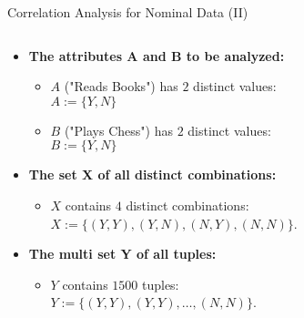 \begin{frame}{Correlation Analysis for Nominal Data (II)}
\begin{columns}
\begin{column}{0.5\textwidth}
\begin{itemize}
				      \begin{itemize}
					      \item \textbf{The attributes A and B to be analyzed:}
					            \begin{itemize}
						            \item $A$ ("Reads Books") has $2$ distinct
						                  values: \\
						                  $A := \{Y, N\}$
						            \item $B$ ("Plays Chess") has $2$ distinct values: \\
						                  $B := \{Y, N\}$
					            \end{itemize}
					      \item \textbf{The set X of all distinct combinations:}
					            \begin{itemize}
						            \item $X$ contains $4$ distinct combinations: \\
						                  $X := \{(Y, Y), (Y, N), (N, Y), (N, N)\}$.
					            \end{itemize}
					      \item \textbf{The multi set Y of all tuples:}
					            \begin{itemize}
						            \item $Y$ contains $1500$ tuples: \\
						                  $Y := \{(Y, Y), (Y, Y), \ldots, (N, N)\}$.
					            \end{itemize}
				      \end{itemize}
			\end{itemize}
		\end{column}
	\end{columns}
\end{frame}

